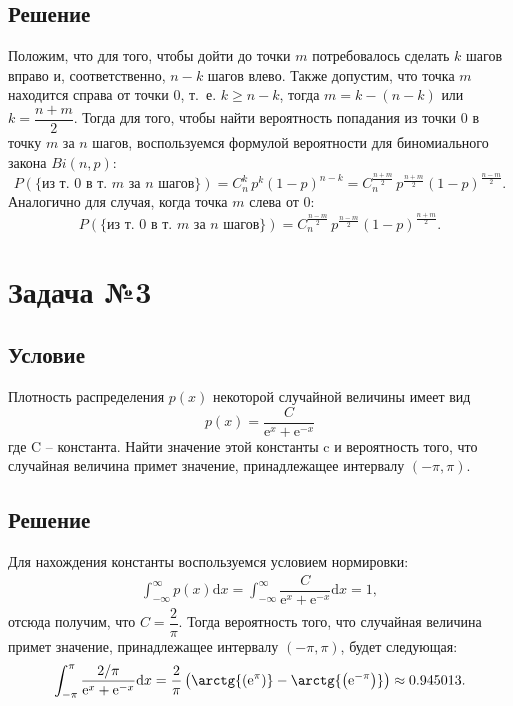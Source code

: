 \documentclass[12pt, a4paper]{article}
\begin{document}
		\subsection*{Решение}
			Положим, что для того, чтобы дойти до точки $m$ потребовалось сделать 
			$k$ шагов вправо и, соответственно, $n - k$ шагов влево. Также допустим, что точка $m$ находится справа от точки $0$, т.~е. $k \geqslant n - k$, тогда $m = k - (n - k)$ или $k = \dfrac{n + m}{2}$. Тогда для того, чтобы найти вероятность попадания из точки 0 в точку $m$ за $n$ шагов, воспользуемся формулой вероятности для биномиального закона $Bi(n,p)$:
			$$
				P(\text{\{из т. 0 в т. $m$ за $n$ шагов\}}) = C_n^{k}\, p^k (1- p)^{n-k} = 
				C_{n}^{\frac{n+m}{2}}\, p^{\frac{n+m}{2}} (1- p)^{\frac{n-m}{2}}.
			$$
			Аналогично для случая, когда точка $m$ слева от $0$:
			$$
			P(\text{\{из т. 0 в т. $m$ за $n$ шагов\}}) = 
			C_{n}^{\frac{n-m}{2}}\, p^{\frac{n-m}{2}} (1- p)^{\frac{n+m}{2}}.
			$$
			
	\newpage
	\section{Задача №3}
	
		\subsection*{Условие}
			Плотность распределения $p(x)$ некоторой случайной величины имеет вид
			$$ p(x) = \dfrac{C}{\mathrm{e}^x + \mathrm{e}^{-x}}$$
			где $\mathrm{C}$ – константа. Найти значение этой константы c и вероятность того, что случайная
			величина примет значение, принадлежащее интервалу $\left(-\pi, \pi\right)$.		
			
		\subsection*{Решение}
			Для нахождения константы воспользуемся условием нормировки: 
			\begin{gather*}
				\int_{-\infty}^{\infty} p(x) \mathrm{d} x = 
				\int_{-\infty}^{\infty} \dfrac{C}{\mathrm{e}^x + \mathrm{e}^{-x}} \mathrm{d} x = 1,
			\end{gather*}
			отсюда получим, что $C = \dfrac{2}{\pi}$. Тогда вероятность того, что случайная величина примет значение, принадлежащее интервалу $\left(-\pi, \pi\right)$, будет следующая:
			\begin{gather*}
				\int_{-\pi}^{\pi} \dfrac{2 / \pi}{\mathrm{e}^x + \mathrm{e}^{-x}} \mathrm{d} x = \dfrac{2}{\pi} 
				\left( 
				\arctg{\left(\mathrm{e}^{\pi}\right)}
				-\arctg{\left(\mathrm{e}^{-\pi}\right)} 
				\right)
				\approx 0.945013.
			\end{gather*}
			
\end{document}
